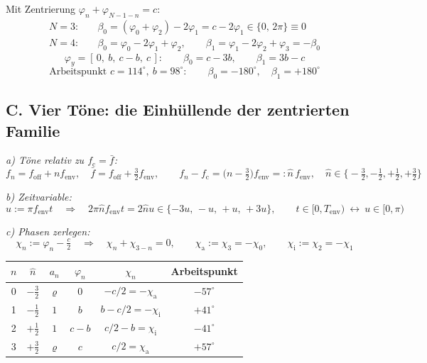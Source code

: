 Mit Zentrierung $\varphi_n+\varphi_{N-1-n}=c$:
\begin{align}
  N=3:&\quad \beta_0 = (\varphi_0+\varphi_2)-2\varphi_1 = c-2\varphi_1 \in\{0,\,2\pi\}\equiv 0\\
  N=4:&\quad \beta_0 = \varphi_0-2\varphi_1+\varphi_2,\qquad
         \beta_1 = \varphi_1-2\varphi_2+\varphi_3 = -\beta_0
\end{align}
\begin{equation}
  \varphi_y = [\,0,\ b,\ c-b,\ c\,]:\qquad \beta_0 = c-3b,\qquad \beta_1 = 3b-c
\end{equation}
\begin{equation}
  \text{Arbeitspunkt } c=114^\circ,\ b=98^\circ:\qquad
  \beta_0 = -180^\circ,\quad \beta_1 = +180^\circ
\end{equation}

\subsection*{C. Vier T\"one: die Einh\"ullende der zentrierten Familie}

\noindent\textit{a) T\"one relativ zu $f_\mathrm{c}=\bar f$:}
\begin{equation}
  f_n = f_\mathrm{off}+n f_\mathrm{env},\quad
  \bar f = f_\mathrm{off}+\tfrac32 f_\mathrm{env},\qquad
  f_n-f_\mathrm{c} = \bigl(n-\tfrac32\bigr)f_\mathrm{env} =: \hat n\,f_\mathrm{env},\quad
  \hat n\in\bigl\{-\tfrac32,-\tfrac12,+\tfrac12,+\tfrac32\bigr\}
\end{equation}

\noindent\textit{b) Zeitvariable:}
\begin{equation}
  u := \pi f_\mathrm{env} t
  \quad\Longrightarrow\quad
  2\pi\hat n f_\mathrm{env} t = 2\hat n u \in\{-3u,\,-u,\,+u,\,+3u\},
  \qquad t\in[0,T_\mathrm{env})\ \leftrightarrow\ u\in[0,\pi)
\end{equation}

\noindent\textit{c) Phasen zerlegen:}
\begin{equation}
  \chi_n := \varphi_n-\tfrac{c}{2}
  \quad\Longrightarrow\quad
  \chi_n+\chi_{3-n} = 0,\qquad
  \chi_\mathrm{a} := \chi_3 = -\chi_0,\qquad
  \chi_\mathrm{i} := \chi_2 = -\chi_1
\end{equation}

\begin{center}
\begin{tabular}{c|c|c|c|c|c}
  \hline
  $n$ & $\hat n$ & $a_n$ & $\varphi_n$ & $\chi_n$ & Arbeitspunkt\\
  \hline
  0 & $-\tfrac32$ & $\varrho$ & $0$   & $-c/2 = -\chi_\mathrm{a}$  & $-57^\circ$\\
  1 & $-\tfrac12$ & $1$       & $b$   & $b-c/2 = -\chi_\mathrm{i}$ & $+41^\circ$\\
  2 & $+\tfrac12$ & $1$       & $c-b$ & $c/2-b = \chi_\mathrm{i}$  & $-41^\circ$\\
  3 & $+\tfrac32$ & $\varrho$ & $c$   & $c/2 = \chi_\mathrm{a}$    & $+57^\circ$\\
  \hline
\end{tabular}
\end{center}

